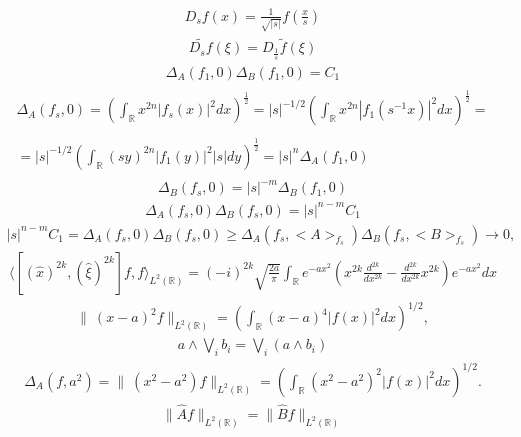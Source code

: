 \begin{align*}D_s f (x) = \frac{1}{\sqrt{|s|}} f \left( \frac{x}{s} \right)\end{align*}
\begin{align*}\widetilde{D_s f} (\xi) = D_{\frac{1}{s}} \widetilde{f} (\xi)\end{align*}
\begin{align*}\Delta_A (f_1,0) \Delta_B (f_1,0) = C_1\end{align*}
\begin{align*}\begin{array}{c}\Delta_A (f_s,0)= \left(\int_{\mathbb{R}} x^{2n} | f_s (x)|^2 dx\right)^{\frac{1}{2}} = |s|^{-1/2} \left(\int_{\mathbb{R}} x^{2n} | f_1 \left( s^{-1} x\right)|^2 dx \right)^{\frac{1}{2}}=\\\\=|s|^{-1/2} \left(\int_{\mathbb{R}} (sy)^{2n} | f_1 \left(y\right)|^2 |s|dy \right)^{\frac{1}{2}}= |s|^n \Delta_A (f_1,0)\end{array}\end{align*}
\begin{align*}\Delta_B (f_s,0) = |s|^{-m} \Delta_B (f_1,0)\end{align*}
\begin{align*}\Delta_A (f_s,0) \Delta_B (f_s,0) = |s|^{n-m} C_1\end{align*}
\begin{align*}|s|^{n-m} C_1=\Delta_A (f_s,0) \Delta_B (f_s,0) \geq \Delta_A (f_s,<A>_{f_s}) \Delta_B (f_s,<B>_{f_s}) \to 0,\end{align*}
\begin{align*}\langle \left[(\widehat x)^{2k}, (\widehat \xi)^{2k} \right] f , f \rangle_{L^2 (\mathbb{R})} = (-i )^{2k} \sqrt{\frac{2a}{\pi}} \int_{\mathbb{R}} e^{-a x^2} \left( x^{2k} \frac{d^{2k}}{dx^{2k}} - \frac{d^{2k}}{dx^{2k}} x^{2k} \right) e^{-a x^2} dx\end{align*}
\begin{align*}\| ~(x-a)^2 f \|_{L^2 (\mathbb{R})}= \left(\int_{\mathbb{R}} (x-a)^4 |f(x)|^2 dx \right)^{1/2},\end{align*}
\begin{align*}a \wedge \bigvee_i b_i = \bigvee_i (a \wedge b_i)\end{align*}
\begin{align*}\Delta_A (f,a^2) =\| ~(x^2-a^2) f \|_{L^2 (\mathbb{R})} = \left(\int_{\mathbb{R}} (x^2-a^2)^2 |f(x)|^2 dx \right)^{1/2}.\end{align*}
\begin{align*}\|\widehat{A} f \|_{L^2 (\mathbb{R})} = \|\widehat{B} f\|_{L^2 (\mathbb{R})}\end{align*}
